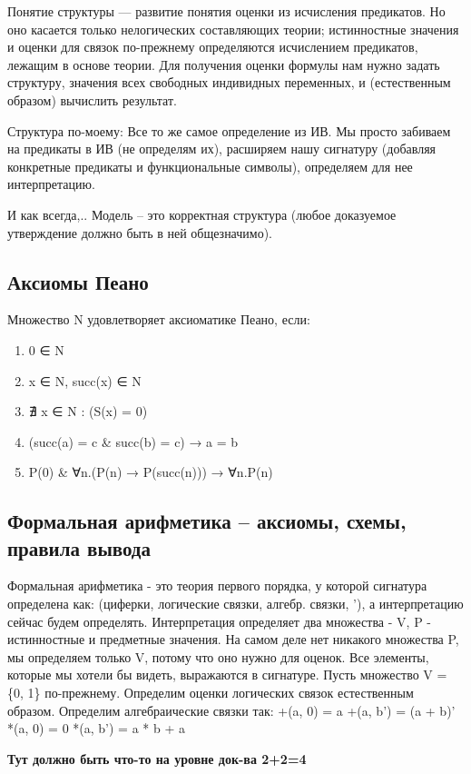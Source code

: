 \documentclass[11pt]{article}
\begin{document}
Понятие структуры — развитие понятия оценки из исчисления предикатов.
Но оно касается только нелогических составляющих теории; истинностные
значения и оценки для связок по-прежнему определяются исчислением
предикатов, лежащим в основе теории. Для получения оценки формулы
нам нужно задать структуру, значения всех свободных индивидных
переменных, и (естественным образом) вычислить результат.

Структура по-моему:
Все то же самое определение из ИВ. Мы просто забиваем на предикаты
в ИВ (не определям их), расширяем нашу сигнатуру (добавляя конкретные
предикаты и функциональные символы), определяем для нее интерпретацию.

И как всегда,..
Модель – это корректная структура (любое доказуемое утверждение должно
быть в ней общезначимо).
\subsection{Аксиомы Пеано}
\label{sec-9-2}
Множество N удовлетворяет аксиоматике Пеано, если:
\begin{enumerate}
\item 0 ∈ N
\item x ∈ N, succ(x) ∈ N
\item ∄ x ∈ N : (S(x) = 0)
\item (succ(a) = c \& succ(b) = c) → a = b
\item P(0) \& ∀n.(P(n) → P(succ(n))) → ∀n.P(n)
\end{enumerate}
\subsection{Формальная арифметика -- аксиомы, схемы, правила вывода}
\label{sec-9-3}
Формальная арифметика - это теория первого порядка, у которой
сигнатура определена как: (циферки, логические связки, алгебр.
связки, '), а интерпретацию сейчас будем определять.
Интерпретация определяет два множества - V, P - истинностные и
предметные значения. На самом деле нет никакого множества P,
мы определяем только V, потому что оно нужно для оценок. Все
элементы, которые мы хотели бы видеть, выражаются в сигнатуре.
Пусть множество V = \{0, 1\} по-прежнему.
Определим оценки логических связок естественным образом.
Определим алгебраические связки так:
+(a, 0) = a
+(a, b') = (a + b)'
*(a, 0) = 0
*(a, b') = a * b + a

\textbf{Тут должно быть что-то на уровне док-ва 2+2=4}
\end{document}
